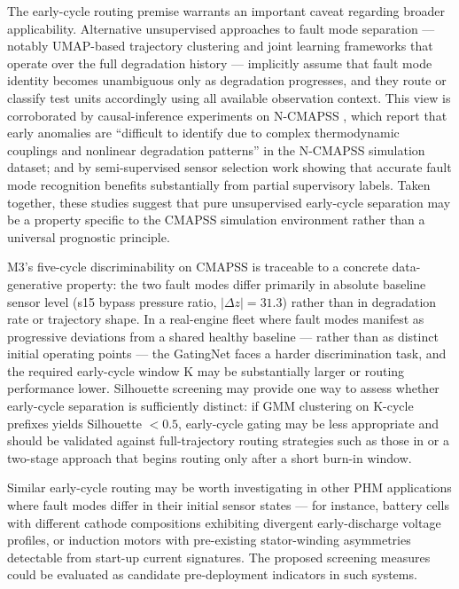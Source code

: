 \documentclass[preprint,10pt]{elsarticle}
\begin{document}
The early-cycle routing premise warrants an important caveat regarding broader applicability. Alternative unsupervised approaches to fault mode separation — notably UMAP-based trajectory clustering \cite{ref46} and joint learning frameworks that operate over the full degradation history \cite{ref47} — implicitly assume that fault mode identity becomes unambiguous only as degradation progresses, and they route or classify test units accordingly using all available observation context. This view is corroborated by causal-inference experiments on N-CMAPSS \cite{ref48}, which report that early anomalies are ``difficult to identify due to complex thermodynamic couplings and nonlinear degradation patterns'' in the N-CMAPSS simulation dataset; and by semi-supervised sensor selection work \cite{ref49} showing that accurate fault mode recognition benefits substantially from partial supervisory labels. Taken together, these studies suggest that pure unsupervised early-cycle separation may be a property specific to the CMAPSS simulation environment rather than a universal prognostic principle.

M3's five-cycle discriminability on CMAPSS is traceable to a concrete data-generative property: the two fault modes differ primarily in absolute baseline sensor level (s15 bypass pressure ratio, $|\Delta z| = 31.3$) rather than in degradation rate or trajectory shape. In a real-engine fleet where fault modes manifest as progressive deviations from a shared healthy baseline --- rather than as distinct initial operating points --- the GatingNet faces a harder discrimination task, and the required early-cycle window K may be substantially larger or routing performance lower. Silhouette screening may provide one way to assess whether early-cycle separation is sufficiently distinct: if GMM clustering on K-cycle prefixes yields Silhouette $< 0.5$, early-cycle gating may be less appropriate and should be validated against full-trajectory routing strategies such as those in \cite{ref46,ref47} or a two-stage approach that begins routing only after a short burn-in window.

Similar early-cycle routing may be worth investigating in other PHM applications where fault modes differ in their initial sensor states --- for instance, battery cells with different cathode compositions exhibiting divergent early-discharge voltage profiles, or induction motors with pre-existing stator-winding asymmetries detectable from start-up current signatures. The proposed screening measures could be evaluated as candidate pre-deployment indicators in such systems.
\end{document}

